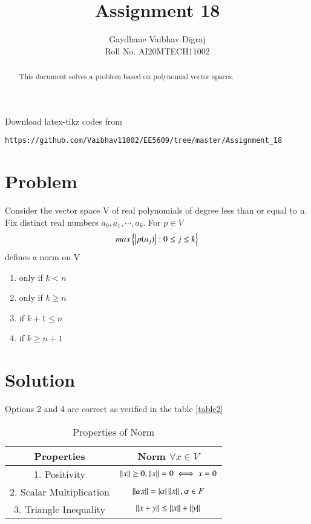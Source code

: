 \documentclass[journal,12pt,twocolumn]{IEEEtran}
\begin{document}
     \def\rightbox#1{\makebox[0in][r]{#1}}
     \def\centbox#1{\makebox[0in]{#1}}
     \def\topbox#1{\raisebox{-\baselineskip}[0in][0in]{#1}}
     \def\midbox#1{\raisebox{-0.5\baselineskip}[0in][0in]{#1}}
\vspace{3cm}
\title{Assignment 18}
\author{Gaydhane Vaibhav Digraj \\ Roll No. AI20MTECH11002}
\maketitle
\newpage
\bigskip
\renewcommand{\thefigure}{\theenumi}
\renewcommand{\thetable}{\theenumi}
\begin{abstract}
This document solves a problem based on polynomial vector spaces.
\end{abstract}
%
Download latex-tikz codes from 
%
\begin{lstlisting}
https://github.com/Vaibhav11002/EE5609/tree/master/Assignment_18
\end{lstlisting}
%
\section{Problem}
Consider the vector space V of real polynomials of degree less than or equal to n. Fix distinct real numbers $a_0, a_1, \cdots, a_k$. For $p \in V$
\begin{align*}
    max\left\{\left\vert p(a_j)\right\vert: 0\leq j \leq k\right\}
\end{align*}
defines a norm on V
\begin{enumerate}
    \item only if $k<n$
    \item only if $k\ge n$
    \item if $ k+1\leq n$ 
    \item if $k \ge n+1$
\end{enumerate}

\section{Solution}
Options 2 and 4 are correct as verified in the table \ref{table2}
\renewcommand{\thetable}{1}
\begin{table*}[ht!]
\begin{center}
\begin{tabular}{|c|c|}
\hline
\textbf{Properties}&\textbf{Norm $\forall x \in V$}\\
\hline
1. Positivity & $\left\lVert x\right\rVert\ge 0, \left\lVert x\right\rVert = 0 \iff x=0 $ \\
\hline
2. Scalar Multiplication & $\left\lVert\alpha x\right\rVert = \left\vert\alpha\right\vert\left\lVert x\right\rVert, \alpha \in F $\\
\hline
3. Triangle Inequality & $\left\lVert x+y\right\rVert \le \left\lVert x\right\rVert + \left\lVert y\right\rVert $\\
\hline
\end{tabular}
\caption{Properties of Norm}
\label{table1}
\end{center}
\end{table*}
\end{document}
